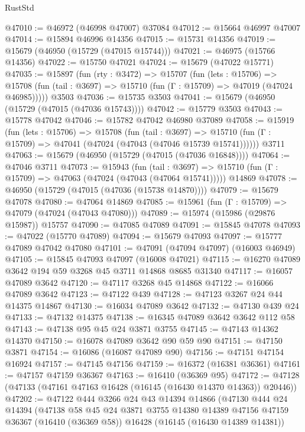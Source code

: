 \begin{lexlean}{RustStd}
\begin{coremodule}
@47010 := @46972 (@46998 @47007) @37084
@47012 := @15664 @46997 @47007
@47014 := @15894 @46996 @14356
@47015 := @15731 @14356
@47019 := @15679 (@46950 (@15729 (@47015 @15744)))
@47021 := @46975 (@15766 @14356)
@47022 := @15750 @47021
@47024 := @15679 (@47022 @15771)
@47035 := @15897
    (fun (rty : @3472) =>
    @15707
      (fun (lets : @15706) =>
      @15708 (fun (tail : @3697) => @15710 (fun (Γ : @15709) => @47019 (@47024 @46985)))))
    @3503
@47036 := @15735 @3503
@47041 := @15679 (@46950 (@15729 (@47015 (@47036 @15743))))
@47042 := @15779 @3503
@47043 := @15778 @47042
@47046 := @15782 @47042 @46980 @37089
@47058 := @15919
    (fun (lets : @15706) =>
    @15708
      (fun (tail : @3697) =>
      @15710 (fun (Γ : @15709) => @47041 (@47024 (@47043 (@47046 @15739 @15741))))))
    @3711
@47063 := @15679 (@46950 (@15729 (@47015 (@47036 @16848))))
@47064 := @47046 @3711
@47073 := @15943
    (fun (tail : @3697) => @15710 (fun (Γ : @15709) => @47063 (@47024 (@47043 (@47064 @15741)))))
    @14869
@47078 := @46950 (@15729 (@47015 (@47036 (@15738 @14870))))
@47079 := @15679 @47078
@47080 := @47064 @14869
@47085 := @15961 (fun (Γ : @15709) => @47079 (@47024 (@47043 @47080)))
@47089 := @15974 (@15986 (@29876 @15987)) @15757
@47090 := @47085 @47089
@47091 := @15845 @47078
@47093 := @47022 (@15770 @47089)
@47094 := @15679 @47093
@47097 := @15777 @47089 @47042 @47080
@47101 := @47091 (@47094 @47097) (@16003 @46949)
@47105 := @15845 @47093 @47097 (@16008 @47021)
@47115 := @16270 @47089 @3642 @194 @59 @3268 @45 @3711 @14868 @8685 @31340
@47117 := @16057 @47089 @3642
@47120 := @47117 @3268 @45 @14868
@47122 := @16066 @47089 @3642
@47123 := @47122 @439
@47128 := @47123 @3267 @24 @44 @14375 @14867
@47130 := @16034 @47089 @3642
@47132 := @47130 @439 @24
@47133 := @47132 @14375
@47138 := @16345 @47089 @3642 @3642 @112 @58
@47143 := @47138 @95 @45 @24 @3871 @3755
@47145 := @47143 @14362 @14370
@47150 := @16078 @47089 @3642 @90 @59 @90
@47151 := @47150 @3871
@47154 := @16086 (@16087 @47089 @90)
@47156 := @47151 @47154 @16924
@47157 := @47145 @47156
@47159 := @16372 (@16381 @36361)
@47161 := @47157 @47159 @36367
@47163 := @16410 (@36369 @95)
@47172 := @47128 (@47133 (@47161 @47163 @16428 (@16145 (@16430 @14370 @14363)) @20446))
@47202 := @47122
    @444
    @3266
    @24
    @43
    @14394
    @14866
    (@47130
      @444
      @24
      @14394
      (@47138
        @58
        @45
        @24
        @3871
        @3755
        @14380
        @14389
        @47156
        @47159
        @36367
        (@16410 (@36369 @58))
        @16428
        (@16145 (@16430 @14389 @14381))

\end{coremodule}
\end{lexlean}
